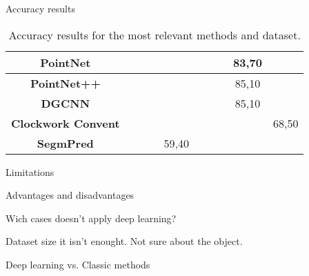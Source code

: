 \begin{frame}[t]{Accuracy results }
\begin{table}[]
\begin{tabular}{|c|c|c|c|c|c|c|c|c|c|}
                \textbf{PointNet}          &      &       &       &       &       &  &       & 83,70 &       \\ \hline
                \textbf{PointNet++}        &      &       &       &       &       &  &       & 85,10 &       \\ \hline
                \textbf{DGCNN}             &      &       &       &       &       &  &       & 85,10 &       \\ \hline
                \textbf{Clockwork Convent} &      &       &       &       &       &  &       &       & 68,50 \\ \hline
                \textbf{SegmPred}          &      &       &       & 59,40 &       &  &       &       &       \\ \hline
                \end{tabular}
                \caption{Accuracy results for the most relevant methods and dataset. \cite{garcia2018survey}}
                \label{tab:accuracy_results}
                \end{table}
\end{frame}


\begin{frame}[t]{Limitations} %
   
\end{frame}

\begin{frame}[t]{Advantages and disadvantages} %
   
\end{frame}

\begin{frame}[t]{Wich cases doesn't apply deep learning?} %

        Dataset size it isn't enought.
        \newline
        \newline
        Not sure about the object.
    
\end{frame}

\begin{frame}[t]{Deep learning vs. Classic methods} %
   
\end{frame}
